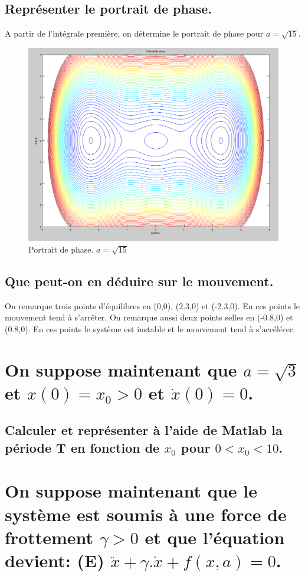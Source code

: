 \documentclass[10pt,a4paper]{article}
\begin{document}
\subsection{Représenter le portrait de phase.}
A partir de l'intégrale première, on détermine le portrait de phase pour $a=\sqrt{15}$.
\begin{figure}[H]
	\includegraphics[scale=0.5]{PortraitDePhase1.png}
	\caption{Portrait de phase. $a=\sqrt{15}$}
\end{figure} 

\subsection{Que peut-on en déduire sur le mouvement.}
On remarque trois points d'équilibres en (0,0), (2.3,0) et (-2.3,0). En ces points le mouvement tend à s'arrêter. On remarque aussi deux points selles en (-0.8,0) et (0.8,0). En ces points le système est instable et le mouvement tend à s'accélérer.%
\section{On suppose maintenant que $a=\sqrt{3}$ et $x(0)=x_0>0$ et $\dot{x}(0)=0$.}
\subsection{Calculer et représenter à l'aide de Matlab la période T en fonction de $x_0$ pour $0<x_0<10$.}

\section{On suppose maintenant que le système est soumis à une force de frottement $\gamma > 0$ et que l'équation devient: (E) $\ddot{x} + \gamma.\dot{x} + f(x,a) = 0$.}
\end{document}
